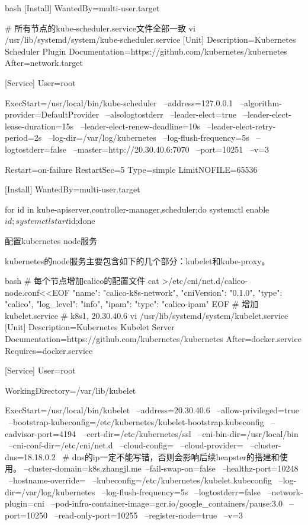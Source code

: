 \begin{outline}[enumerate]
\begin{code-block}{bash}
[Install]
WantedBy=multi-user.target

# 所有节点的kube-scheduler.service文件全部一致
vi /usr/lib/systemd/system/kube-scheduler.service
[Unit]
Description=Kubernetes Scheduler Plugin
Documentation=https://github.com/kubernetes/kubernetes
After=network.target

[Service]
User=root

ExecStart=/usr/local/bin/kube-scheduler \
    --address=127.0.0.1 \
    --algorithm-provider=DefaultProvider \
    --alsologtostderr \
    --leader-elect=true \
    --leader-elect-lease-duration=15s \
    --leader-elect-renew-deadline=10s \
    --leader-elect-retry-period=2s \
    --log-dir=/var/log/kubernetes \
    --log-flush-frequency=5s \
    --logtostderr=false \
    --master=http://20.30.40.6:7070 \
    --port=10251 \
    --v=3

Restart=on-failure
RestartSec=5
Type=simple
LimitNOFILE=65536

[Install]
WantedBy=multi-user.target

for id in kube-{apiserver,controller-manager,scheduler};do systemctl enable $id;systemctl start $id;done
\end{code-block}

  \1 配置kubernetes node服务

kubernetes的node服务主要包含如下的几个部分：kubelet和kube-proxy。
\begin{code-block}{bash}
# 每个节点增加calico的配置文件
cat >/etc/cni/net.d/calico-node.conf<<EOF
{
    "name": "calico-k8s-network",
    "cniVersion": "0.1.0",
    "type": "calico",
    "log_level": "info",
    "ipam": {
        "type": "calico-ipam"
    }
}
EOF
# 增加kubelet.service
# k8s1, 20.30.40.6
vi /usr/lib/systemd/system/kubelet.service
[Unit]
Description=Kubernetes Kubelet Server
Documentation=https://github.com/kubernetes/kubernetes
After=docker.service
Requires=docker.service

[Service]
User=root

WorkingDirectory=/var/lib/kubelet

ExecStart=/usr/local/bin/kubelet \
    --address=20.30.40.6 \
    --allow-privileged=true \
    --bootstrap-kubeconfig=/etc/kubernetes/kubelet-bootstrap.kubeconfig \
    --cadvisor-port=4194 \
    --cert-dir=/etc/kubernetes/ssl \
    --cni-bin-dir=/usr/local/bin \
    --cni-conf-dir=/etc/cni/net.d \
    --cloud-config= \
    --cloud-provider= \
    --cluster-dns=18.18.0.2 \         # dns的ip一定不能写错，否则会影响后续heapster的搭建和使用。
    --cluster-domain=k8s.zhangjl.me\
    --fail-swap-on=false \
    --healthz-port=10248 \
    --hostname-override= \
    --kubeconfig=/etc/kubernetes/kubelet.kubeconfig \
    --log-dir=/var/log/kubernetes \
    --log-flush-frequency=5s \
    --logtostderr=false \
    --network-plugin=cni \
    --pod-infra-container-image=gcr.io/google_containers/pause:3.0 \
    --port=10250 \
    --read-only-port=10255 \
    --register-node=true \
    --v=3


\end{code-block}
\end{outline}

